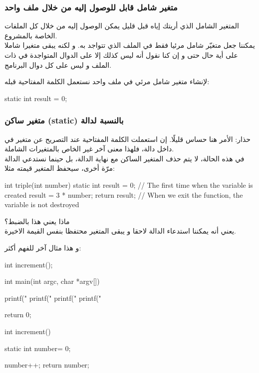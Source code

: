\subsubsection{متغير شامل قابل للوصول إليه من خلال ملف واحد}

المتغير الشامل الذي أريتك إياه قبل قليل يمكن الوصول إليه من خلال كل الملفات الخاصة بالمشروع.\\
يمكننا جعل متغيّر شامل مرئيا فقط في الملف الذي تتواجد به. و لكنه يبقى متغيرا شاملا على أية حال حتى و إن كنا نقول أنه ليس كذلك إلا على الدوال المتواجدة في ذات الملف و ليس على كل دوال البرنامج.

لإنشاء متغير شامل مرئي في ملف واحد نستعمل الكلمة المفتاحية
قبله:

\begin{Csource}
static int result = 0;
\end{Csource}

\subsubsection{متغير ساكن (\textenglish{static}) بالنسبة لدالة}

حذار: الأمر هنا حساس قليلًا. إن استعملت الكلمة المفتاحية
عند التصريح عن متغير في داخل دالة، فلهذا معنى آخر غير الخاص بالمتغيرات الشاملة.\\
في هذه الحالة، لا يتم حذف المتغير الساكن مع نهاية الدالة، بل حينما نستدعي الدالة مرّة أخرى، سيحفظ المتغير قيمته مثلا:
\begin{Csource}
int triple(int number)
{
	static int result = 0; // The first time when the variable is created
	result = 3 * number;
	return result;
} // When we exit the function, the variable is not destroyed
\end{Csource}
ماذا يعني هذا بالضبط؟\\
يعني أنه يمكننا استدعاء الدالة لاحقا و يبقى المتغير
محتفظا بنفس القيمة الاخيرة.

و هذا مثال آخر للفهم أكثر:
\begin{Csource}
int increment();

int main(int argc, char *argv[])
{
	printf("%
	printf("%
	printf("%
	printf("%

	return 0;
}

int increment()
{
	static int number= 0;

	number++;
	return number;
}
\end{Csource}

